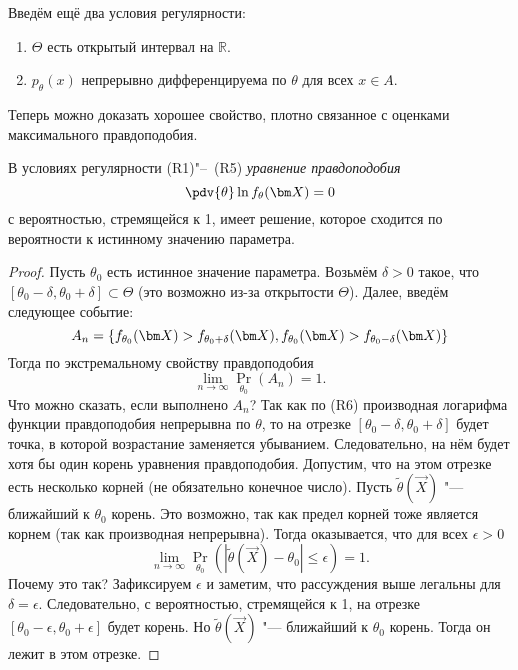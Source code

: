 Введём ещё два условия регулярности:
\begin{enumerate}[label=(R\arabic*), start=4]
    \item $\Theta$ есть открытый интервал на $\mathbb{R}$.
    \item $p_{\theta}(x)$ непрерывно дифференцируема по $\theta$ для всех $x \in A$.
\end{enumerate}
Теперь можно доказать хорошее свойство, плотно связанное с оценками максимального правдоподобия.
\begin{theorem}
    В условиях регулярности (R1)"--~(R5) \emph{уравнение правдоподобия}
    \[
        \pdv{\theta}\ln f_{\theta}(\vec{X}) = 0
    \]
    с вероятностью, стремящейся к 1, имеет решение, которое сходится по вероятности к истинному значению параметра.
\end{theorem}
\begin{proof}
    Пусть $\theta_{0}$ есть истинное значение параметра. Возьмём $\delta > 0$ такое, что $[\theta_{0} - \delta, \theta_{0} + \delta] \subset \Theta$ (это возможно из-за открытости $\Theta$). Далее, введём следующее событие:
    \[
        A_{n} = \set{f_{\theta_{0}}(\vec{X}) > f_{\theta_{0} + \delta}(\vec{X}), f_{\theta_{0}}(\vec{X}) > f_{\theta_{0} - \delta}(\vec{X})}
    \]
    Тогда по экстремальному свойству правдоподобия
    \[
        \lim\limits_{n \to \infty} \Pr_{\theta_{0}}(A_{n}) = 1.
    \]
    Что можно сказать, если выполнено $A_{n}$? Так как по (R6) производная логарифма функции правдоподобия непрерывна по $\theta$, то на отрезке $[\theta_{0} - \delta, \theta_{0} + \delta]$ будет точка, в которой возрастание заменяется убыванием. Следовательно, на нём будет хотя бы один корень уравнения правдоподобия. Допустим, что на этом отрезке есть несколько корней (не обязательно конечное число). Пусть $\tilde{\theta}(\vec{X})$ "--- ближайший к $\theta_{0}$ корень. Это возможно, так как предел корней тоже является корнем (так как производная непрерывна). Тогда оказывается, что для всех $\epsilon > 0$
    \[ 
        \lim\limits_{n \to \infty} \Pr_{\theta_{0}}(|\tilde{\theta}(\vec{X}) - \theta_{0}| \leq \epsilon) 
        = 1.
    \]
    Почему это так? Зафиксируем $\epsilon$ и заметим, что рассуждения выше легальны для $\delta = \epsilon$. Следовательно, с вероятностью, стремящейся к 1, на отрезке $[\theta_{0} - \epsilon, \theta_{0} + \epsilon]$ будет корень. Но $\tilde{\theta}(\vec{X})$ "--- ближайший к $\theta_{0}$ корень. Тогда он лежит в этом отрезке.
\end{proof}

